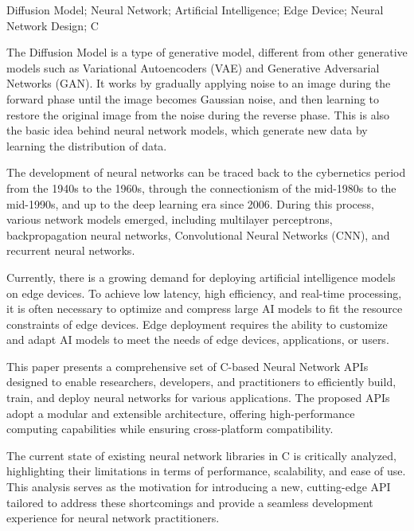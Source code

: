 \begin{abstractEng}{Diffusion Model; Neural Network; Artificial Intelligence; Edge Device; Neural Network Design; C}
    \par The Diffusion Model is a type of generative model, 
    different from other generative models such as Variational Autoencoders (VAE) and Generative Adversarial Networks (GAN). 
    It works by gradually applying noise to an image during the forward phase until the image becomes Gaussian noise, 
    and then learning to restore the original image from the noise during the reverse phase. 
    This is also the basic idea behind neural network models, which generate new data by learning the distribution of data.

    \par The development of neural networks can be traced back to the cybernetics period from the 1940s to the 1960s, 
    through the connectionism of the mid-1980s to the mid-1990s, and up to the deep learning era since 2006. 
    During this process, various network models emerged, 
    including multilayer perceptrons, backpropagation neural networks, Convolutional Neural Networks (CNN), and recurrent neural networks.

    \par Currently, there is a growing demand for deploying artificial intelligence models on edge devices. 
    To achieve low latency, high efficiency, and real-time processing, 
    it is often necessary to optimize and compress large AI models to fit the resource constraints of edge devices. 
    Edge deployment requires the ability to customize and adapt AI models to meet the needs of edge devices, applications, or users.

    \par This paper presents a comprehensive set of C-based Neural Network APIs 
    designed to enable researchers, developers, and practitioners to efficiently build, train, 
    and deploy neural networks for various applications. 
    The proposed APIs adopt a modular and extensible architecture, 
    offering high-performance computing capabilities while ensuring cross-platform compatibility.

    \par The current state of existing neural network libraries in C is critically analyzed, 
    highlighting their limitations in terms of performance, scalability, and ease of use. 
    This analysis serves as the motivation for introducing a new, 
    cutting-edge API tailored to address these shortcomings and provide a seamless development experience for neural network practitioners.
    

\end{abstractEng}
